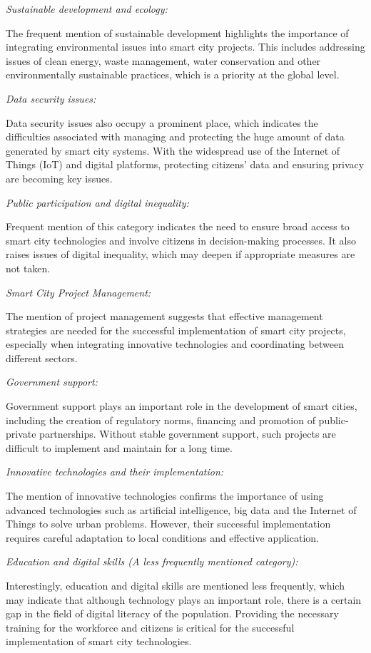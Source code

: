 {\emph{Sustainable development and ecology:}

The frequent mention of sustainable development highlights the
importance of integrating environmental issues into smart city projects.
This includes addressing issues of clean energy, waste management, water
conservation and other environmentally sustainable practices, which is a
priority at the global level.

\emph{Data security issues:}

Data security issues also occupy a prominent place, which indicates the
difficulties associated with managing and protecting the huge amount of
data generated by smart city systems. With the widespread use of the
Internet of Things (IoT) and digital platforms, protecting
citizens'{} data and ensuring privacy are becoming key
issues.

\emph{Public participation and digital inequality:}

Frequent mention of this category indicates the need to ensure broad
access to smart city technologies and involve citizens in
decision-making processes. It also raises issues of digital inequality,
which may deepen if appropriate measures are not taken.

\emph{Smart City Project Management:}

The mention of project management suggests that effective management
strategies are needed for the successful implementation of smart city
projects, especially when integrating innovative technologies and
coordinating between different sectors.

\emph{Government support:}

Government support plays an important role in the development of smart
cities, including the creation of regulatory norms, financing and
promotion of public-private partnerships. Without stable government
support, such projects are difficult to implement and maintain for a
long time.

\emph{Innovative technologies and their implementation:}

The mention of innovative technologies confirms the importance of using
advanced technologies such as artificial intelligence, big data and the
Internet of Things to solve urban problems. However, their successful
implementation requires careful adaptation to local conditions and
effective application.

\emph{Education and digital skills (A less frequently mentioned
category):}

Interestingly, education and digital skills are mentioned less
frequently, which may indicate that although technology plays an
important role, there is a certain gap in the field of digital literacy
of the population. Providing the necessary training for the workforce
and citizens is critical for the successful implementation of smart city
technologies.

}

